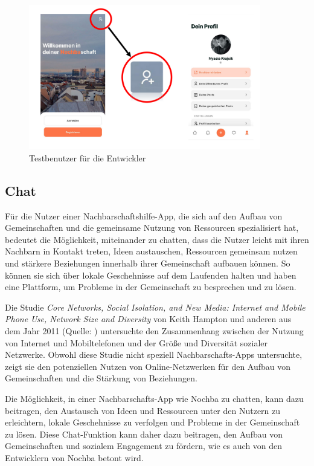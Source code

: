 \begin{figure}[H]
  \centering
  \includegraphics[width=0.9\textwidth]{pics/dummy-user-screenshots.png}
  \caption{Testbenutzer für die Entwickler}
  \label{fig:dummy-user-screenshots}
\end{figure}


\subsection{Chat}

Für die Nutzer einer Nachbarschaftshilfe-App, die sich auf den Aufbau von Gemeinschaften und die gemeinsame Nutzung von Ressourcen spezialisiert hat, bedeutet die Möglichkeit, miteinander zu chatten, dass die Nutzer leicht mit ihren Nachbarn in Kontakt treten, Ideen austauschen, Ressourcen gemeinsam nutzen und stärkere Beziehungen innerhalb ihrer Gemeinschaft aufbauen können. So können sie sich über lokale Geschehnisse auf dem Laufenden halten und haben eine Plattform, um Probleme in der Gemeinschaft zu besprechen und zu lösen.

Die Studie \textit{Core Networks, Social Isolation, and New Media: Internet and Mobile Phone Use, Network Size and Diversity} von Keith Hampton und anderen aus dem Jahr 2011 (Quelle: \cite{hampton2011core}) untersuchte den Zusammenhang zwischen der Nutzung von Internet und Mobiltelefonen und der Größe und Diversität sozialer Netzwerke. Obwohl diese Studie nicht speziell Nachbarschafts-Apps untersuchte, zeigt sie den potenziellen Nutzen von Online-Netzwerken für den Aufbau von Gemeinschaften und die Stärkung von Beziehungen.

Die Möglichkeit, in einer Nachbarschafts-App wie Nochba zu chatten, kann dazu beitragen, den Austausch von Ideen und Ressourcen unter den Nutzern zu erleichtern, lokale Geschehnisse zu verfolgen und Probleme in der Gemeinschaft zu lösen. Diese Chat-Funktion kann daher dazu beitragen, den Aufbau von Gemeinschaften und sozialem Engagement zu fördern, wie es auch von den Entwicklern von Nochba betont wird.

